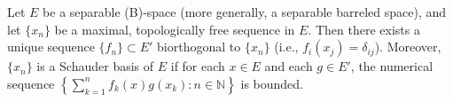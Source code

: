 Let $E$ be a separable (B)-space (more generally, a separable barreled space), and let $\{x_n\}$ be a maximal, topologically free sequence in $E$. Then there exists a unique sequence $\{f_n\} \subset E'$ biorthogonal to $\{x_n\}$ (i.e., $f_i(x_j) = \delta_{ij}$). Moreover, $\{x_n\}$ is a Schauder basis of $E$ if for each $x \in E$ and each $g \in E'$, the numerical sequence $\left\{\sum_{k=1}^{n} f_k(x) g(x_k) : n \in \mathbb{N}\right\}$ is bounded.
